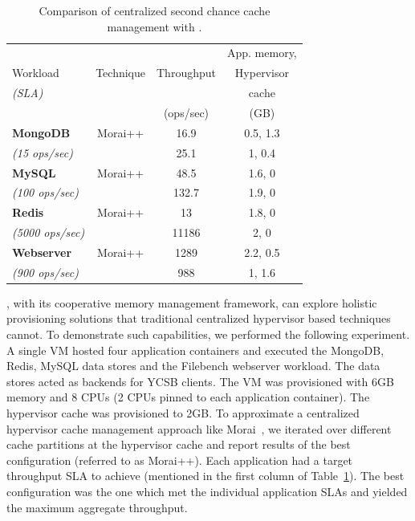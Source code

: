 \begin{table}[t]
\small
\begin{center}
\begin{tabular}{|l|c|c|c|}
\hline
{}           & {} & {} & {App. memory,}\\
{ Workload}  & { Technique} &  Throughput{} & {Hypervisor} \\
{\em (SLA)} & & { } & {cache}  \\
& & { (ops/sec)} & {(GB)}  \\
\hline 
\hline 
{\bf MongoDB} & Morai++ & 16.9 & 0.5, 1.3 \\
{\em (15 ops/sec)} & \dd{}& 25.1 & 1, 0.4  \\
\hline
{\bf MySQL} & Morai++ & 48.5 & 1.6, 0 \\
{\em (100 ops/sec)} & \dd{} & 132.7 & 1.9, 0 \\
\hline
{\bf Redis} & Morai++ & 13 & 1.8, 0 \\
{\em (5000 ops/sec)} & \dd{} & 11186  & 2, 0 \\
\hline
{\bf Webserver} & Morai++ & 1289 & 2.2, 0.5 \\
{\em (900 ops/sec)} & \dd{} & 988 & 1, 1.6  \\
\hline 
\end{tabular}
\caption{Comparison of centralized second chance cache management with \dd{}.}
\vspace{-1cm}
\label{table:ddsdc}
\end{center}
\end{table}
%
\dd{}, with its cooperative memory management framework, can explore 
holistic provisioning solutions that traditional centralized hypervisor
based techniques cannot.
%
To demonstrate such capabilities, we performed the following experiment.
%
A single VM hosted four application containers and executed the 
MongoDB, Redis, MySQL data stores and the Filebench webserver workload.
The data stores acted as backends for YCSB clients.
The VM was provisioned with 6GB memory and 8 CPUs (2 CPUs pinned
to each application container).
%
The hypervisor cache was provisioned to 2GB.
%
To approximate a centralized hypervisor cache management approach 
like Morai~\cite{sdc},
we iterated over different cache partitions at the hypervisor 
cache and report
results of the best configuration (referred to as Morai++).
%
Each application had a target throughput SLA to achieve (mentioned
in the first column of Table~\ref{table:ddsdc}). The best configuration
was the one which met the individual application SLAs and yielded
the maximum aggregate throughput.
%
% 

